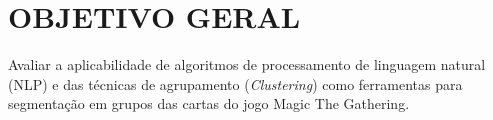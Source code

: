 \section{OBJETIVO GERAL}
\label{sec:objetivo_geral}


Avaliar a aplicabilidade de algoritmos de processamento de linguagem natural (NLP) e das técnicas de agrupamento (\textit{Clustering}) como ferramentas para segmentação em grupos das cartas do jogo Magic The Gathering.